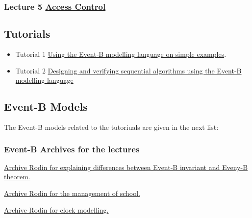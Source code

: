 \documentclass[ 12pt]{article}
\begin{document}
\subsubsection{ Lecture 5 
    \href{http://mery54.github.io/teaching/mosos/lecturesnotes/mcfsi-maynooth-lect3.pdf}{Access 
      Control }
}



\subsection{Tutorials}

\begin{itemize}
 
  \item[]   Tutorial 1 
    \href{http://mery54.github.io/teaching/mosos/lecturesnotes/mastertutorial1.pdf}{Using 
      the Event-B modelling language on simple examples}.


    
  \item[]   Tutorial 2
    \href{http://mery54.github.io/teaching/mosos/lecturesnotes/mastertutorial2.pdf}{Designing
      and verifying sequential algorithms using the Event-B modelling      language}
  
  \end{itemize}

    \subsection{Event-B Models}
\label{sec:event-b-models}


The Event-B models related to the tutoriuals are given in the next list: 

\subsubsection{Event-B Archives for the  lectures}

 \href{http://mery54.github.io/teaching/mosos/lecturesnotes/
   ex-safety.zip}{Archive Rodin  for  explaining differences between
   Event-B invariant and Eveny-B theorem. }


 
 \href{http://mery54.github.io/teaching/mosos/models/
   ex-school.zip}{Archive Rodin  for   the management of school. }

 
 
 \href{http://mery54.github.io/teaching/mosos/models/clock-tut0.zip}{Archive Rodin  for  clock modelling. }
\end{document}

